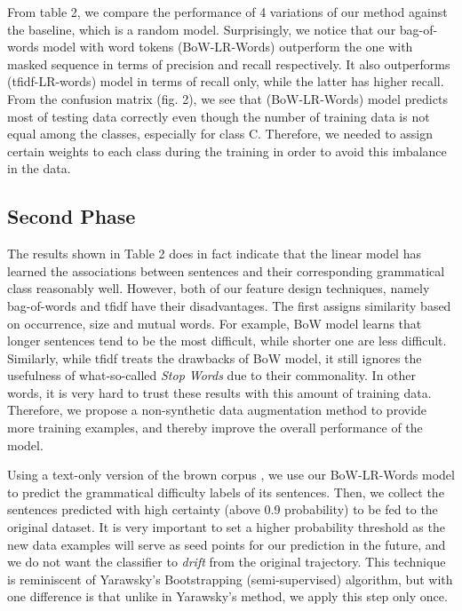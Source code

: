 From table 2, we compare the performance of 4 variations of our method against the baseline, which is a random model. Surprisingly, we notice that our bag-of-words model with word tokens (BoW-LR-Words) outperform the one with masked sequence in terms of precision and recall respectively. It also outperforms (tfidf-LR-words) model in terms of recall only, while the latter has higher recall. From the confusion matrix (fig. 2), we see that (BoW-LR-Words) model predicts most of testing data correctly even though the number of training data is not equal among the classes, especially for class C. Therefore, we needed to assign certain weights to each class during the training in order to avoid this imbalance in the data. 

\subsection{Second Phase}

The results shown in Table 2 does in fact indicate that the linear model has learned the associations between sentences and their corresponding grammatical class reasonably well. However, both of our feature design techniques, namely bag-of-words and tfidf have their disadvantages. The first assigns similarity based on occurrence, size and mutual words. For example, BoW model learns that longer sentences tend to be the most difficult, while shorter one are less difficult. Similarly, while tfidf treats the drawbacks of BoW model, it still ignores the usefulness of what-so-called \textit{Stop Words} due to their commonality. In other words, it is very hard to trust these results with this amount of training data. Therefore, we propose a non-synthetic data augmentation method to provide more training examples, and thereby improve the overall performance of the model. 

Using a text-only version of the brown corpus \cite{citeulike:13797746} , we use our BoW-LR-Words model to predict the grammatical difficulty labels of its sentences. Then, we collect the sentences predicted with high certainty (above 0.9 probability) to be fed to the original dataset. It is very important to set a higher probability threshold as the new data examples will serve as seed points for our prediction in the future, and we do not want the classifier to \textit{drift} from the original trajectory. This technique is reminiscent of Yarawsky's Bootstrapping \citep{yarowsky_unsupervised_1995}(semi-supervised) algorithm, but with one difference is that unlike in Yarawsky's method, we apply this step only once. 

